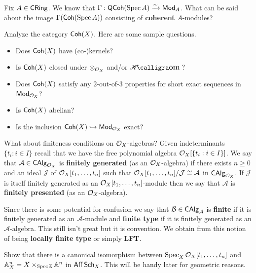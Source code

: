 \documentclass[11pt]{article}
\renewcommand{\AA}{\mathcal{A}}
\newcommand{\BB}{\mathcal{B}}
\newcommand{\J}{\mathcal{J}}
\begin{document}
\begin{exercise}
Fix $A\in\operatorname{\mathsf{CRing}}$. We know that $\Gamma: \operatorname{\mathsf{QCoh}}(\operatorname{Spec} A)\xrightarrow{\sim}\operatorname{\mathsf{Mod}}_A$. What can be said about the image $\Gamma(\operatorname{\mathsf{Coh}}(\operatorname{Spec} A))$ consisting of \textbf{coherent} $A$-modules?
\end{exercise}

\begin{exercise}
Analyze the category $\operatorname{\mathsf{Coh}}(X)$. Here are some sample questions.
\begin{itemize}
\item Does $\operatorname{\mathsf{Coh}}(X)$ have (co-)kernels?

\item Is $\operatorname{\mathsf{Coh}}(X)$ closed under $\otimes_{\mathcal{O}_X}$ and/or $\HHom$?

\item Does $\operatorname{\mathsf{Coh}}(X)$ satisfy any $2$-out-of-$3$ properties for short exact sequences in $\operatorname{\mathsf{Mod}}_{\mathcal{O}_X}$?

\item Is $\operatorname{\mathsf{Coh}}(X)$ abelian?

\item Is the inclusion $\operatorname{\mathsf{Coh}}(X)\hookrightarrow\operatorname{\mathsf{Mod}}_{\mathcal{O}_X}$ exact?
\end{itemize}
\end{exercise}

What about finiteness conditions on $\mathcal{O}_X$-algebras? Given indeterminants $\{t_i : i\in I\}$ recall that we have the free polynomial algebra $\mathcal{O}_X[\{t_i : i\in I\}]$. We say that $\AA\in\CAlg_{\O_X}$ is \textbf{finitely generated} (as an $\mathcal{O}_X$-algebra) if there exists $n\geq0$ and an ideal $\J$ of $\mathcal{O}_X[t_1,\ldots,t_n]$ such that $\O_X[t_1,\ldots,t_n]/\J\iso\AA$ in $\operatorname{\mathsf{CAlg}}_{\mathcal{O}_X}$. If $\J$ is itself finitely generated as an $\mathcal{O}_X[t_1,\ldots,t_n]$-module then we say that $\AA$ is \textbf{finitely presented} (as an $\mathcal{O}_X$-algebra). 

\begin{remark}
Since there is some potential for confusion we say that $\BB\in\CAlg_{\AA}$ is \textbf{finite} if it is finitely generated as an $\AA$-module and \textbf{finite type} if it is finitely generated as an $\AA$-algebra. This still isn't great but it is convention. We obtain from this notion of being \textbf{locally finite type} or simply \textbf{LFT}.
\end{remark}

\begin{exercise}
Show that there is a canonical isomorphism between $\operatorname{Spec}_X\mathcal{O}_X[t_1,\ldots,t_n]$ and $\mathbb{A}_X^n=X\times_{\operatorname{Spec}\mathbb{Z}}\mathbb{A}^n$ in $\operatorname{\mathsf{Aff}}\operatorname{\mathsf{Sch}}_X$. This will be handy later for geometric reasons.
\end{exercise}
\end{document}

